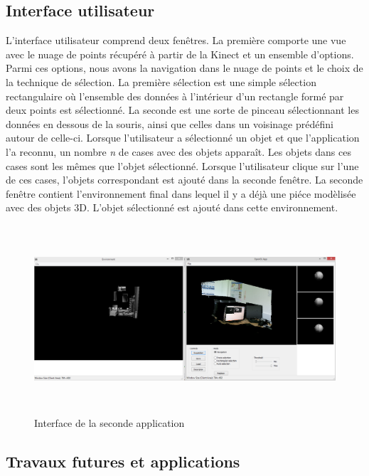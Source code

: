 
\subsection{Interface utilisateur}
L'interface utilisateur comprend deux fenêtres. La première comporte une vue avec le nuage de points récupéré à partir de la Kinect
et un ensemble d'options. Parmi ces options, nous avons la navigation dans le nuage de points et le choix de la technique de 
sélection. La première sélection est une simple sélection rectangulaire où l'ensemble des données à l'intérieur d'un rectangle formé
par deux points est sélectionné. La seconde est une sorte de pinceau sélectionnant les données en dessous de la souris, ainsi que celles dans 
un voisinage prédéfini autour de celle-ci. Lorsque l'utilisateur a sélectionné un objet et que l'application l'a reconnu, un nombre \textit{n} de cases 
avec des objets apparaît. Les objets dans ces cases sont les mêmes que l'objet sélectionné. Lorsque l'utilisateur clique sur l'une 
de ces cases, l'objets correspondant est ajouté dans la seconde fenêtre.
La seconde fenêtre contient l'environnement final dans lequel il y a déjà une piéce modèlisée avec des objets 3D. L'objet sélectionné est 
ajouté dans cette environnement.

\begin{figure}[!h]
  \begin{center}
    \includegraphics[height=7cm]{image/appliObjet.PNG}
    \caption{Interface de la seconde application}
  \end{center}
\end{figure}

\subsection{Travaux futures et applications}
